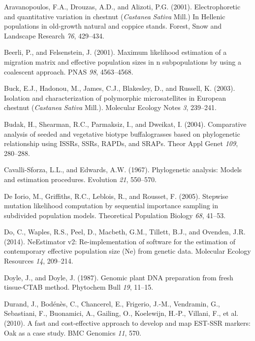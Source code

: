 \documentclass[12pt,a4paper,]{report}
\begin{document}
\leavevmode\hypertarget{ref-Aravanopoulos2001}{}%
Aravanopoulos, F.A., Drouzas, A.D., and Alizoti, P.G. (2001).
Electrophoretic and quantitative variation in chestnut (\emph{Castanea}
\emph{Sativa} Mill.) In Hellenic populations in old-growth natural and
coppice stands. Forest, Snow and Landscape Research \emph{76}, 429--434.

\leavevmode\hypertarget{ref-beerli_maximum_2001}{}%
Beerli, P., and Felsenstein, J. (2001). Maximum likelihood estimation of
a migration matrix and effective population sizes in n subpopulations by
using a coalescent approach. PNAS \emph{98}, 4563--4568.

\leavevmode\hypertarget{ref-buck_isolation_2003}{}%
Buck, E.J., Hadonou, M., James, C.J., Blakesley, D., and Russell, K.
(2003). Isolation and characterization of polymorphic microsatellites in
European chestnut (\emph{Castanea} \emph{Sativa} Mill.). Molecular
Ecology Notes \emph{3}, 239--241.

\leavevmode\hypertarget{ref-budak_comparative_2004}{}%
Budak, H., Shearman, R.C., Parmaksiz, I., and Dweikat, I. (2004).
Comparative analysis of seeded and vegetative biotype buffalograsses
based on phylogenetic relationship using ISSRs, SSRs, RAPDs, and SRAPs.
Theor Appl Genet \emph{109}, 280--288.

\leavevmode\hypertarget{ref-cavalli1967phylogenetic}{}%
Cavalli-Sforza, L.L., and Edwards, A.W. (1967). Phylogenetic analysis:
Models and estimation procedures. Evolution \emph{21}, 550--570.

\leavevmode\hypertarget{ref-de_iorio_stepwise_2005}{}%
De Iorio, M., Griffiths, R.C., Leblois, R., and Rousset, F. (2005).
Stepwise mutation likelihood computation by sequential importance
sampling in subdivided population models. Theoretical Population Biology
\emph{68}, 41--53.

\leavevmode\hypertarget{ref-Do2014}{}%
Do, C., Waples, R.S., Peel, D., Macbeth, G.M., Tillett, B.J., and
Ovenden, J.R. (2014). NeEstimator v2: Re-implementation of software for
the estimation of contemporary effective population size (Ne) from
genetic data. Molecular Ecology Resources \emph{14}, 209--214.

\leavevmode\hypertarget{ref-doyle1987genomic}{}%
Doyle, J., and Doyle, J. (1987). Genomic plant DNA preparation from
fresh tissue-CTAB method. Phytochem Bull \emph{19}, 11--15.

\leavevmode\hypertarget{ref-durand_fast_2010}{}%
Durand, J., Bodénès, C., Chancerel, E., Frigerio, J.-M., Vendramin, G.,
Sebastiani, F., Buonamici, A., Gailing, O., Koelewijn, H.-P., Villani,
F., et al. (2010). A fast and cost-effective approach to develop and map
EST-SSR markers: Oak as a case study. BMC Genomics \emph{11}, 570.
\end{document}
